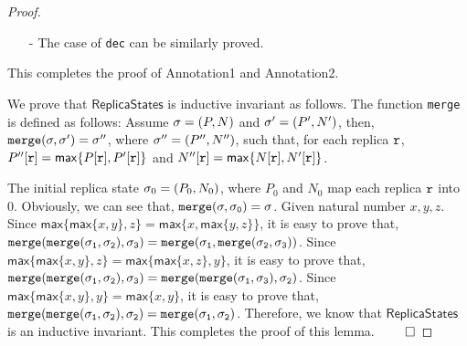 \begin {proof}
\begin{itemize}
\item[-] The case of {\tt dec} can be similarly proved.
\end{itemize}

This completes the proof of Annotation1 and Annotation2.



We prove that $\mathsf{ReplicaStates}$ is inductive invariant as follows. The function {\tt merge} is defined as follows: Assume $\astate = (P,N)$ and $\astate' = (P',N')$, then, $\alabelshort[{\tt merge}]{\astate,\astate'} = \astate''$, where $\astate'' = (P'',N'')$, such that, for each replica $\arep$, $P''[\arep] = \mathsf{max}\{ P[\arep], P'[\arep] \}$ and $N''[\arep] = \mathsf{max}\{ N[\arep], N'[\arep] \}$.

The initial replica state $\astate_0 = (P_0,N_0)$, where $P_0$ and $N_0$ map each replica $\arep$ into $0$. Obviously, we can see that, $\alabelshort[{\tt merge}]{\astate,\astate_0} = \astate$. Given natural number $x,y,z$. Since $\mathsf{max}\{ \mathsf{max}\{ x,y \}, z \} = \mathsf{max}\{ x, \mathsf{max}\{ y,z \} \}$, it is easy to prove that, $\alabelshort[{\tt merge}]{\alabelshort[{\tt merge}]{\astate_1,\astate_2},\astate_3} = \alabelshort[{\tt merge}]{\astate_1,\alabelshort[{\tt merge}]{\astate_2,\astate_3}}$. Since $\mathsf{max}\{ \mathsf{max}\{ x,y \}, z \} = \mathsf{max}\{ \mathsf{max}\{ x,z \}, y \}$, it is easy to prove that, $\alabelshort[{\tt merge}]{\alabelshort[{\tt merge}]{\astate_1,\astate_2},\astate_3} = \alabelshort[{\tt merge}]{\alabelshort[{\tt merge}]{\astate_1,\astate_3},\astate_2}$. Since $\mathsf{max}\{ \mathsf{max}\{ x,y \}, y \} = \mathsf{max}\{ x, y \}$, it is easy to prove that, $\alabelshort[{\tt merge}]{\alabelshort[{\tt merge}]{\astate_1,\astate_2},\astate_2} = \alabelshort[{\tt merge}]{\astate_1,\astate_2}$. Therefore, we know that $\mathsf{ReplicaStates}$ is an inductive invariant. This completes the proof of this lemma. $\qed$

\end {proof}
